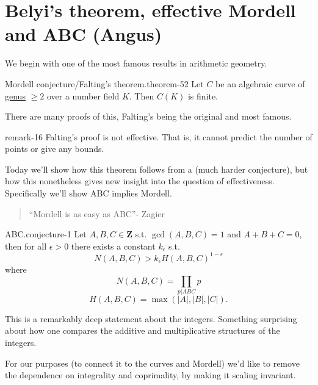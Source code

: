 \documentclass[10pt,]{book}
\numberwithin{equation}{section}
\newcommand{\ZZ}{\mathbf{Z}}
\newcommand{\gt}{>}
\begin{document}
\section[{Belyi's theorem, effective Mordell and ABC (Angus)}]{Belyi's theorem, effective Mordell and ABC (Angus)}\label{sec-beyi-abc}
\hypertarget{p-665}{}%
We begin with one of the most famous results in arithmetic geometry.%
\begin{theorem}{Mordell conjecture/Falting's theorem.}{}{theorem-52}%
\hypertarget{p-666}{}%
Let \(C\) be an algebraic curve of \hyperref[fact-existance-genus]{genus} \(\ge 2\) over a number field \(K\). Then \(C(K)\) is finite.%
\end{theorem}
\hypertarget{p-667}{}%
There are many proofs of this, Falting's being the original and most famous.%
\begin{remark}{}{remark-16}%
\hypertarget{p-668}{}%
Falting's proof is not effective. That is, it cannot predict the number of points or give any bounds.%
\end{remark}
\hypertarget{p-669}{}%
Today we'll show how this theorem follows from a (much harder conjecture), but how this nonetheless gives new insight into the question of effectiveness. Specifically we'll show ABC implies Mordell.%
\begin{quote}\hypertarget{blockquote-1}{}
\hypertarget{p-670}{}%
``Mordell is as easy as ABC''- Zagier%
\end{quote}
\begin{conjecture}{ABC.}{}{conjecture-1}%
\hypertarget{p-671}{}%
Let \(A,B,C\in \ZZ\) s.t. \(\gcd(A,B,C)  =1 \) and \(A+B+C=0\), then for all \(\epsilon \gt 0\) there exists a constant \(k_\epsilon\) s.t.%
\begin{equation*}
N(A,B,C) \gt k_\epsilon H(A,B,C)^{1-\epsilon}
\end{equation*}
where%
\begin{equation*}
N(A,B,C) =  \prod_{p|ABC} p
\end{equation*}
%
\begin{equation*}
H(A,B,C) = \max(|A|,|B|,|C|)\text{.}
\end{equation*}
%
\end{conjecture}
\hypertarget{p-672}{}%
This is a remarkably deep statement about the integers. Something surprising about how one compares the additive and multiplicative structures of the integers.%
\par
\hypertarget{p-673}{}%
For our purposes (to connect it to the curves and Mordell) we'd like to remove the dependence on integrality and coprimality, by making it scaling invariant.%
\end{document}
